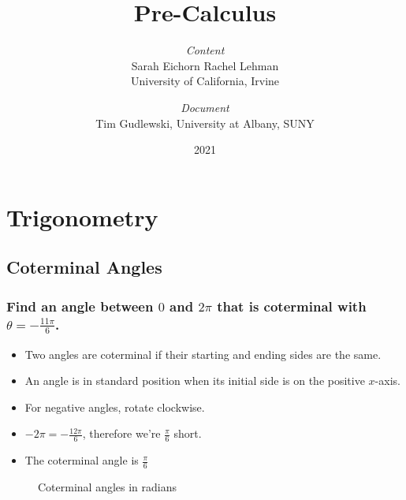 \documentclass{article}
\title{Pre-Calculus}
\author{\emph{Content}\\Sarah Eichorn \qquad Rachel Lehman\\University of California, Irvine
\and \emph{Document}\\Tim Gudlewski, University at Albany, SUNY}
\date{2021}
\begin{document}
\maketitle
\setcounter{secnumdepth}{2}
\setcounter{tocdepth}{2}
\tableofcontents

\section{Trigonometry}
\subsection{Coterminal Angles}
\subsubsection{Find an angle between $0$ and $2\pi$ that is coterminal with
$\theta = -\frac{11\pi}{6}$.}
\begin{itemize}
  \item Two angles are coterminal if their starting and ending sides are the same.
  \item An angle is in standard position when its initial side is on the positive $x$-axis.
  \item For negative angles, rotate clockwise.
  \item $-2\pi = -\frac{12\pi}{6}$, therefore we're $\frac{\pi}{6}$ short.
  \item The coterminal angle is $\frac{\pi}{6}$
\end{itemize}
\begin{figure}[h]
  \centering
  
  \caption{Coterminal angles in radians}
\end{figure}
\end{document}
